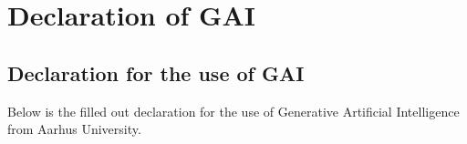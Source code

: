 \chapter{Declaration of GAI}
\section{Declaration for the use of GAI}
Below is the filled out declaration for the use of Generative Artificial Intelligence from Aarhus University.

